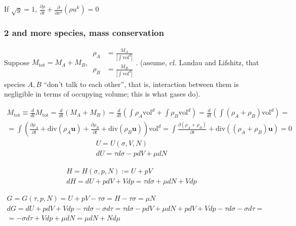 \documentclass[10pt]{amsart}
\begin{document}
\begin{multicols*}{2}
If $\sqrt{g}=1$, $\frac{ \partial \rho}{ \partial t} + \frac{ \partial }{ \partial x^k}(\rho u^k) = 0 $

\subsubsection{ 2 and more species, mass conservation}

Suppose $M_{\text{tot}} = M_A + M_B$, $\begin{aligned} \rho_{A} & = \frac{ M_A}{ | \int \text{vol}^d| } \\ \rho_{B} & = \frac{ M_B}{ | \int \text{vol}^d| } \end{aligned}$.  (assume, cf. Landau and Lifshitz, that species $A,B$ ``don't talk to each other'', that is, interaction between them is negligible in terms of occupying volume; this is what gases do).

\[
\begin{gathered}
  \dot{M}_{\text{tot}} \equiv \frac{d}{dt} M_{\text{tot}} = \frac{d}{dt}(M_A + M_B) = \frac{d}{dt} \left( \int \rho_A \text{vol}^d + \int \rho_B \text{vol}^d\right) = \frac{d}{dt} \left( \int (\rho_A + \rho_B) \text{vol}^d\right) = \\
  = \int \left( \frac{ \partial \rho_A}{ \partial t} + \text{div}(\rho_A \mathbf{u}) + \frac{ \partial \rho_B}{\partial t} + \text{div}(\rho_B \mathbf{u}) \right) \text{vol}^d   = \int \frac{ \partial (\rho_A + \rho_B) }{ \partial t} + \text{div}((\rho_A + \rho_B)\mathbf{u} ) = 0 
  \end{gathered}
\]
\begin{equation}
  \begin{gathered}
    U = U(\sigma, V,N) \\ 
    dU  = \tau d\sigma - p dV + \mu dN
    \end{gathered}
  \end{equation}


\begin{equation}
\begin{gathered}
  H=H(\sigma,p,N) := U + pV \\
dH = dU + pdV + Vdp = \tau d\sigma + \mu dN + Vdp
\end{gathered}
\end{equation}

\begin{equation}
\begin{gathered}
  G = G(\tau, p , N) = U + pV - \tau \sigma = H-\tau \sigma = \mu N \\ 
  dG = dU + pdV + Vdp - \tau d\sigma - \sigma d\tau = \tau d\sigma - pdV + \mu dN + pdV + Vdp - \tau d\sigma - \sigma d\tau = \\
  = -\sigma d\tau + Vdp + \mu dN = \mu dN + N d\mu
  \end{gathered}
  \end{equation}


\end{multicols*}
\end{document}
